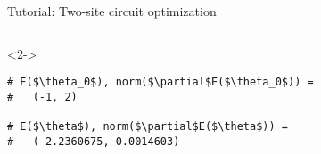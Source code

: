 \begin{frame}[fragile]{Tutorial: Two-site circuit optimization}
\begin{columns}
\begin{column}{5cm}
\begin{onlyenv}
\end{onlyenv}

\begin{onlyenv}<2->

\begin{lstlisting}[style=julia, numbers=none, mathescape, basicstyle=\small]
# E($\theta_0$), norm($\partial$E($\theta_0$)) =
#   (-1, 2)

# E($\theta$), norm($\partial$E($\theta$)) =
#   (-2.2360675, 0.0014603)
 \end{lstlisting}

\end{onlyenv}

\end{column}

\end{columns}

\end{frame}
